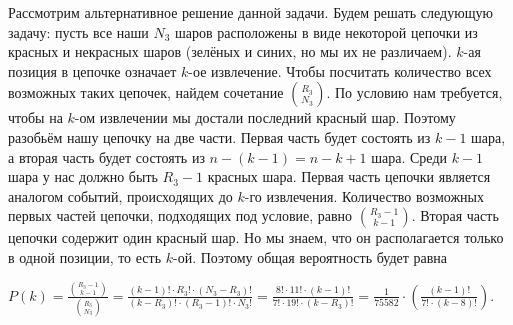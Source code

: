 \documentclass{article}
\begin{document}
Рассмотрим альтернативное решение данной задачи. Будем решать следующую задачу: пусть все наши \begin{math} N_3 \end{math} шаров расположены в виде некоторой цепочки из красных и некрасных шаров (зелёных и синих, но мы их не различаем). \begin{math}
k
\end{math}-ая позиция в цепочке означает \begin{math}
k
\end{math}-ое извлечение. Чтобы посчитать количество всех возможных таких цепочек, найдем сочетание \begin{math}
\displaystyle{R_3 \choose N_3}
\end{math}. По условию нам требуется, чтобы на \begin{math}
k
\end{math}-ом извлечении мы достали последний красный шар. Поэтому разобьём нашу цепочку на две части. Первая часть будет состоять из \begin{math}
k - 1
\end{math} шара, а вторая часть будет состоять из \begin{math}
n - (k -1) = n - k + 1
\end{math} шара. Среди \begin{math}
k - 1
\end{math} шара у нас должно быть \begin{math}
R_3 - 1
\end{math} красных шара. Первая часть цепочки является аналогом событий, происходящих до \begin{math}k
\end{math}-го извлечения. Количество возможных первых частей цепочки, подходящих под условие, равно \begin{math}
\displaystyle{R_3 - 1 \choose k - 1}
\end{math}. Вторая часть цепочки содержит один красный шар. Но мы знаем, что он располагается только в одной позиции, то есть \begin{math}
k
\end{math}-ой. Поэтому общая вероятность будет равна
\begin{center}
    \begin{math}
    P(k) = \displaystyle\frac{\displaystyle{R_3 - 1 \choose k - 1}}{\displaystyle{R_3 \choose N_3}} = \displaystyle\frac{(k-1)! \cdot R_3! \cdot (N_3 - R_3)!}{(k - R_3)! \cdot (R_3 - 1)! \cdot N_3!} = \displaystyle\frac{8! \cdot 11! \cdot (k-1)!}{ 7! \cdot 19!\cdot (k - R_3)!} = \displaystyle\frac{1}{75582} \cdot \left( \displaystyle\frac{(k-1)!}{7! \cdot (k - 8)!} \right)
    \end{math}.
\end{center}
\end{document}
